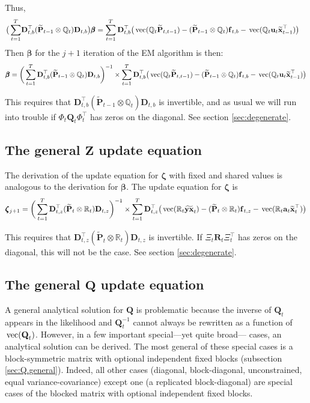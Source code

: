 \documentclass[]{article}
\def\bbeta{\pmb{\beta}}
\def\zzeta{\pmb{\zeta}}
\def\XI{\mbox{\boldmath $\Xi$}}
\def\DD{\mbox{$\mathbf D$}}	\def\dd{\mbox{$\mathbf d$}}
\def\PP{\mbox{$\mathbf P$}}  \def\pp{\mbox{$\mathbf p$}}
\def\QQ{\mbox{$\mathbf Q$}}	 \def\qq{\mbox{$\mathbf q$}} \def\Qb{\mbox{$\mathbf G$}}  \def\Qm{\mathbb{Q}}
\def\RR{\mbox{$\mathbf R$}}	 \def\rr{\mbox{$\mathbf r$}} \def\Rb{\mbox{$\mathbf H$}}	\def\Rm{\mathbb{R}}
\def\ZZ{\mbox{$\mathbf Z$}}	\def\zz{\mbox{$\mathbf z$}}	\def\Zb{\mbox{$\mathbf M$}} \def\Za{\mbox{$\mathbf N$}} \def\Zm{\XI}
\def\vec{\,\textup{\textrm{vec}}}
\def\hatxt{\widetilde{\mbox{$\mathbf x$}}_t}
\def\hatxtm{\widetilde{\mbox{$\mathbf x$}}_{t-1}}
\def\hatYXt{\widetilde{\mbox{$\mathbf{y}\mathbf{x}$}}_t}
\def\hatPt{\widetilde{\PP}_t}
\def\hatPtm{\widetilde{\PP}_{t-1}}
\def\hatPttm{\widetilde{\PP}_{t,t-1}}
\begin{document}
Thus,
\begin{equation}
\begin{split}
\big(\sum_{t=1}^T &\DD_{t,b}^\top(\hatPtm  \otimes \Qm_t)\DD_{t,b} \big)\bbeta 
 =  \sum_{t=1}^T \DD_{t,b}^\top \big(\vec(\Qm_t\hatPttm) - (\hatPtm \otimes \Qm_t)\ff_{t,b} - \vec(\Qm_t\uu_t\hatxtm^\top)  \big)
\end{split}
\end{equation}
Then $\bbeta$ for the $j+1$ iteration of the EM algorithm is then:
\begin{equation}\label{eq:B.general4}
\begin{split}
\bbeta = \bigg(\sum_{t=1}^T \DD_{t,b}^\top(\hatPtm  \otimes \Qm_t)\DD_{t,b} \bigg)^{-1}
\times \sum_{t=1}^T \DD_{t,b}^\top \big(\vec(\Qm_t\hatPttm) - (\hatPtm \otimes \Qm_t)\ff_{t,b} - \vec(\Qm_t\uu_t\hatxtm^\top)  \big)
\end{split}
\end{equation}

This requires that $\DD_{t,b}^\top(\hatPtm  \otimes \Qm_t)\DD_{t,b}$ is invertible, and as usual we will run into trouble if $\Phi_t\QQ_t\Phi_t^\top$ has zeros on the diagonal. See section \ref{sec:degenerate}.

\subsection{The general $\ZZ$ update equation}\label{sec:constZ}
The derivation of the update equation for $\zzeta$ with fixed and shared values is analogous to the derivation for $\bbeta$.  The update equation for $\zzeta$ is
\begin{equation}\label{eq:general.Z.update}
\begin{split}
\zzeta_{j+1} = 
\bigg(\sum_{t=1}^T \DD_{t,z}^\top(\hatPt  \otimes \Rm_t)\DD_{t,z} \bigg)^{-1} 
\times  \sum_{t=1}^T \DD_{t,z}^\top \big(\vec(\Rm_t\hatYXt) - (\hatPt \otimes \Rm_t)\ff_{t,z} - \vec(\Rm_t\aa_t\hatxt^\top)  \big)
\end{split}
\end{equation}

This requires that $\DD_{t,z}^\top(\hatPt \otimes \Rm_t)\DD_{t,z}$ is invertible. If $\Xi_t\RR_t\Xi_t^\top$ has zeros on the diagonal, this will not be the case. See section \ref{sec:degenerate}. 

\subsection{The general $\QQ$ update equation}\label{sec:constrained.Q}
A general analytical solution for $\QQ$ is problematic because the inverse of $\QQ_t$ appears in the likelihood and  $\QQ_t^{-1}$ cannot always be rewritten as a function of $\vec(\QQ_t)$. However, in a few important special---yet quite broad--- cases, an analytical solution can be derived.  The most general of these special cases is a block-symmetric matrix with optional independent fixed blocks (subsection \ref{sec:Q.general}).  Indeed, all other cases (diagonal, block-diagonal, unconstrained, equal variance-covariance) except one (a replicated block-diagonal) are special cases of the blocked matrix with optional independent fixed blocks. 
\end{document}
